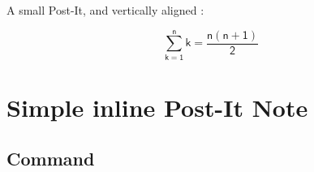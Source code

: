 \documentclass[english,a4paper,11pt]{article}
\begin{document}
\begin{DemoCode}[]
\begin{wrapstuff}[r,top=1]
\begin{PostItNote}[Rotate=5,Corner,Color=pink,PinkColor=blue,Border=false]
\lipsum[1][1-2]
\end{PostItNote}
\end{wrapstuff}

\lipsum[1]
\end{DemoCode}

\begin{DemoCode}[]
\begin{wrapstuff}[r,top=1]
\begin{PostItNote}[Rotate=5,Render=tikz,Color=pink, PinkColor=blue,Border=false]
\lipsum[1][1-2]
\end{PostItNote}
\end{wrapstuff}

\lipsum[1]
\end{DemoCode}

\begin{DemoCode}[]
\begin{wrapstuff}[r,top=1]
\begin{PostItNote}[Rotate=5,Render=tikzv2,Pin=Scotch,Color=pink]
\lipsum[1][1-2]
\end{PostItNote}
\end{wrapstuff}

\lipsum[1]
\end{DemoCode}

\begin{DemoCode}[]
A small Post-It, and vertically aligned :
%
\hfill\begin{PostItNote}[Rotate=-10,Color=orange,Width=5cm,Height=5cm, AlignV=center,Corner,PinColor=yellow, PinShift=-1,AlignPostIt=center]

\textsf{\small\lipsum[1][1-2]}
\[\mathsf{\displaystyle\sum_{k=1}^{n} k = \dfrac{n(n+1)}{2}}\]
\end{PostItNote}
\end{DemoCode}

\pagebreak

\section{Simple inline Post-It Note}

\subsection{Command}
\end{document}
